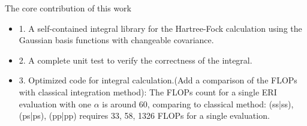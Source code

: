 \documentclass[aspectratio=169]{beamer}
\begin{document}
\begin{frame}{The core contribution of this work}
	\begin{itemize}
		\item 1. A self-contained integral library for the Hartree-Fock calculation
		using the Gaussian basis functions with changeable covariance.
		\item 2. A complete unit test to verify the correctness of the integral.
		\item 3. Optimized code for integral calculation.(Add a comparison of the FLOPs with classical
		integration method): The FLOPs count for a single ERI evaluation with one $\alpha$ is around 60, comparing
		to classical method: (ss|ss), (ps|ps), (pp|pp) requires 33, 58, 1326 FLOPs for a single evaluation.
	\end{itemize}
\end{frame}
\end{document}
